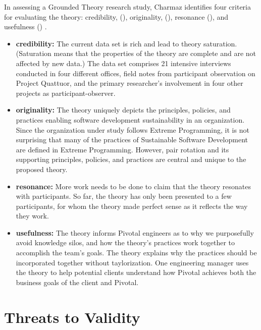 \begin{table}[]
In assessing a Grounded Theory research study, Charmaz identifies four criteria for evaluating the theory: credibility, (), originality, (), resonance (), and usefulness () \cite{StolGTinSE}. 

\begin{itemize}
\item 
\textbf{credibility:}  The current data set is rich and lead to theory saturation. (Saturation means that the properties of the theory are complete and are not affected by new data.) The data set comprises 21 intensive interviews conducted in four different offices,  field notes from participant observation on Project Quattuor, and the primary researcher's involvement in four other projects as participant-observer.

\item
\textbf{originality:} The theory uniquely depicts the principles, policies, and practices enabling software development sustainability in an organization. Since the organization under study follows Extreme Programming, it is not surprising that many of the practices of Sustainable Software Development are defined in Extreme Programming. However, pair rotation and its supporting principles, policies, and practices are central and unique to the proposed theory.

\item
\textbf{resonance:} More work needs to be done to claim that the theory resonates with participants. So far, the theory has only been presented to a few participants, for whom the theory made perfect sense as it reflects the way they work. 

\item
\textbf{usefulness:}  The theory informs Pivotal engineers as to why we purposefully avoid knowledge silos, and how the theory's practices work together to accomplish the team's goals.  The theory explains why the practices should be incorporated together without taylorization. One engineering manager uses the theory to help potential clients understand how Pivotal  achieves both the business goals of the client and Pivotal.

\end{itemize}

\section{Threats to Validity}


\end{table}
